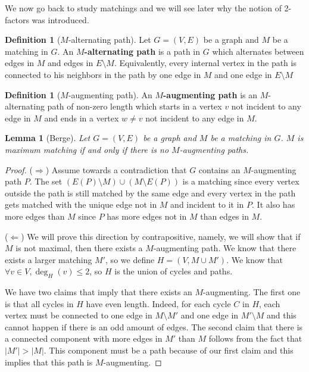 \documentclass{tufte-handout}
\newtheorem{lem}[thm]{Lemma}
\theoremstyle{definition}
\newtheorem{defn}[thm]{Definition}
\theoremstyle{remark}
\begin{document}
We now go back to study matchings and we will see later why the notion of 2-factors was introduced.
\begin{defn}[$M$-alternating path]
	Let $G=(V,E)$ be a graph and $M$ be a matching in $G$. An \textbf{$M$-alternating path} is a path in $G$ which alternates between edges in $M$ and edges in $E\setminus M$. Equivalently, every internal vertex in the path is connected to his neighbors in the path by one edge in $M$ and one edge in $E \setminus M$
\end{defn}
\begin{defn}[$M$-augmenting path]
	An \textbf{$M$-augmenting path} is an $M$-alternating path of non-zero length which starts in a vertex $v$ not incident to any edge in $M$ and ends in a vertex $w \neq v$ not incident to any edge in $M$.
\end{defn}
\begin{lem}[Berge]
	Let $G = (V,E)$ be a graph and $M$ be a matching in $G$. $M$ is maximum matching if and only if there is no $M$-augmenting paths.
\end{lem}
\begin{proof}
	($\Rightarrow$) Assume towards a contradiction that $G$ contains an $M$-augmenting path $P$. The set $(E(P) \setminus M) \cup (M \setminus E(P))$ is a matching since every vertex outside the path is still matched by the same edge and every vertex in the path gets matched with the unique edge not in $M$ and incident to it in $P$. It also has more edges than $M$ since $P$ has more edges not in $M$ than edges in $M$.
	
	($\Leftarrow$) We will prove this direction by contrapositive, namely, we will show that if $M$ is not maximal, then there exists a $M$-augmenting path. We know that there exists a larger matching $M'$, so we define $H = (V, M \cup M')$. We know that $\forall v \in V, \deg_H(v) \leq 2$, so $H$ is the union of cycles and paths.
	
	We have two claims that imply that there exists an $M$-augmenting. The first one is that all cycles in $H$ have even length. Indeed, for each cycle $C$ in $H$, each vertex must be connected to one edge in $M\setminus M'$ and one edge in $M'\setminus M$ and this cannot happen if there is an odd amount of edges. The second claim that there is a connected component with more edges in $M'$ than $M$ follows from the fact that $|M'| > |M|$. This component must be a path because of our first claim and this implies that this path is $M$-augmenting.
\end{proof}
\end{document}
